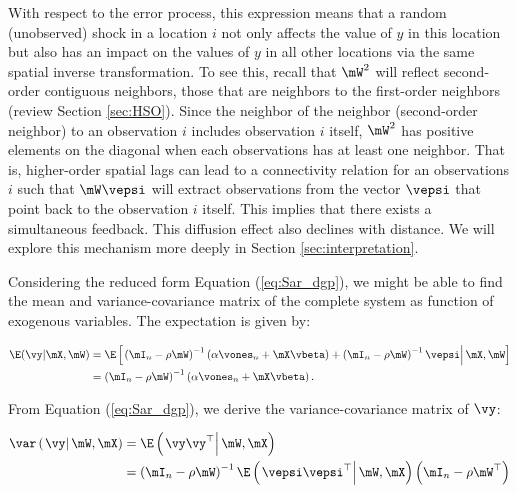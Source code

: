 \documentclass[english,12pt]{book}\usepackage[]{graphicx}\usepackage[]{xcolor}
\begin{document}
With respect to the error process, this expression means that a random (unobserved) shock in a location $i$ not only affects the value of $y$ in this location but also has an impact on the values of $y$ in all other locations via the same spatial inverse transformation. To see this, recall that $\mW^2$ will reflect second-order contiguous neighbors, those that are neighbors to the first-order neighbors (review Section \ref{sec:HSO}). Since the neighbor of the neighbor (second-order neighbor) to an observation $i$ includes observation $i$ itself, $\mW^2$ has positive elements on the diagonal when each observations has at least one neighbor. That is, higher-order spatial lags can lead to a connectivity relation for an observations $i$ such that $\mW\vepsi$ will extract observations from the vector $\vepsi$ that point back to the observation $i$ itself. This implies that there exists a simultaneous feedback. This diffusion effect also declines with distance. We will explore this mechanism more deeply in Section \ref{sec:interpretation}.

Considering the reduced form Equation (\ref{eq:Sar_dgp}), we might be able to find the mean and variance-covariance matrix of the complete system as function of exogenous variables. The expectation is given by:

\begin{equation}\label{eq:expected_value_slm}
  \begin{aligned}
\E(\vy|\mX,\mW) & = \E\left[\left.\left(\mI_n - \rho \mW\right)^{-1}\left(\alpha \vones_n + \mX\vbeta\right) + \left(\mI_n - \rho \mW\right)^{-1}\vepsi\right|\mX,\mW\right] \\
                & = \left(\mI_n - \rho \mW\right)^{-1}\left(\alpha \vones_n + \mX\vbeta\right).
\end{aligned}
\end{equation}

From Equation (\ref{eq:Sar_dgp}), we derive the variance-covariance matrix of $\vy$:

\begin{equation}
  \begin{aligned}
    \var\left(\left.\vy\right|\mW, \mX\right) & = \E\left(\left.\vy\vy^\top\right|\mW,\mX\right) \\ 
                               & = \left(\mI_n - \rho\mW\right)^{-1}\E\left(\left.\vepsi\vepsi^\top\right|\mW, \mX\right)\left(\mI_n- \rho\mW^\top\right)
  \end{aligned}
\end{equation}
\end{document}
